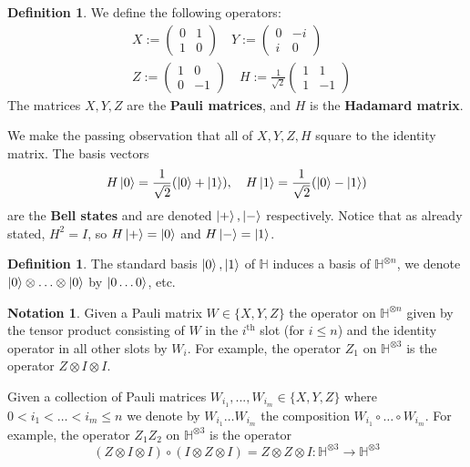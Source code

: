 \documentclass[12pt]{article}
\theoremstyle{plain}
\theoremstyle{definition}
\newtheorem{defn}[thm]{Definition} %
\newtheorem{notation}[thm]{Notation}
\newcommand{\bb}[1]{\mathbb{#1}}
\newcommand{\lto}{\longrightarrow}
\begin{document}
	\begin{defn}\label{def:pauli_hadamard}
	We define the following operators:
	\begin{align*}
		&X :=
		\begin{pmatrix}
			0 &1\\
			1 &0
		\end{pmatrix}
		\quad
		Y :=
		\begin{pmatrix}
			0 & -i\\
			i & 0
		\end{pmatrix}\\
		&Z :=
		\begin{pmatrix}
			1 & 0\\
			0 & -1
		\end{pmatrix}
		\quad
		H :=
		\frac{1}{\sqrt{2}}
		\begin{pmatrix}
			1 & 1\\
			1 & -1
		\end{pmatrix}
	\end{align*}
	The matrices $X,Y,Z$ are the \textbf{Pauli matrices}, and $H$ is the \textbf{Hadamard matrix}.
\end{defn}
We make the passing observation that all of $X,Y,Z,H$ square to the identity matrix. The basis vectors
\begin{equation}
	H\ket{0} = \frac{1}{\sqrt{2}}(\ket{0} + \ket{1}),\quad H\ket{1} = \frac{1}{\sqrt{2}}(\ket{0} - \ket{1})
\end{equation}
are the \textbf{Bell states} and are denoted $\ket{+},\ket{-}$ respectively. Notice that as already stated, $H^2 = I$, so $H\ket{+} = \ket{0}$ and $H\ket{-} = \ket{1}$.
\begin{defn}
	The standard basis $\ket{0},\ket{1}$ of $\bb{H}$ induces a basis of $\bb{H}^{\otimes n}$, we denote $\ket{0} \otimes \hdots \otimes \ket{0}$ by $\ket{0\hdots 0}$, etc.
\end{defn}

\begin{notation}\label{not:Pauli_comp}
	Given a Pauli matrix $W \in \{ X, Y , Z \}$ the operator on $\bb{H}^{\otimes n}$ given by the tensor product consisting of $W$ in the $i^{\text{th}}$ slot (for $i \leq n$) and the identity operator in all other slots by $W_i$. For example, the operator $Z_1$ on $\bb{H}^{\otimes 3}$ is the operator $Z \otimes I \otimes I$.
	
	Given a collection of Pauli matrices $W_{i_1},...,W_{i_m} \in \lbrace X,Y,Z\rbrace$ where $0 < i_1 < \hdots < i_m \leq n$ we denote by $W_{i_1}\ldots W_{i_m}$ the composition $W_{i_1} \circ \ldots \circ W_{i_m}$. For example, the operator $Z_1Z_2$ on $\bb{H}^{\otimes 3}$ is the operator
	\begin{equation}
		(Z \otimes I \otimes I) \circ (I \otimes Z \otimes I) = Z \otimes Z \otimes I: \bb{H}^{\otimes 3} \lto \bb{H}^{\otimes 3}
	\end{equation}
\end{notation}
\end{document}

